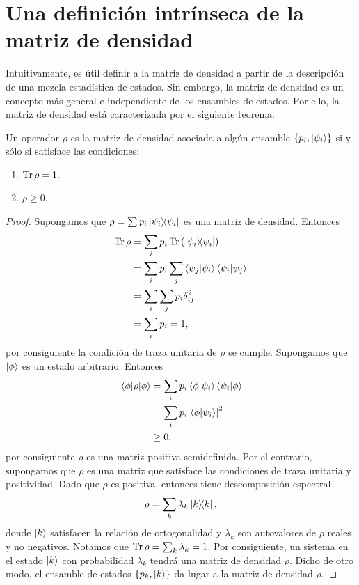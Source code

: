 \documentclass[11pt,dvipsnames]{report}
\newcommand{\psii}{\psi_i}
\begin{document}

\section{Una definición intrínseca de la matriz de densidad}
Intuitivamente, es útil definir a la matriz de densidad a partir de la 
descripción de una mezcla estadística de estados. Sin embargo, la matriz 
de densidad es un concepto más general e independiente de los ensambles de
estados. Por ello, la matriz de densidad está caracterizada por el siguiente
teorema.  
\begin{teorema}
Un operador $\rho$ es la matriz de densidad asociada a algún ensamble 
$\{p_i, \ket{\psi _i} \}$ si y sólo si satisface las condiciones:
\begin{enumerate}
\item $\Tr \rho = 1$.
\item $\rho \geq 0$.
\end{enumerate}	
\end{teorema}

\begin{proof}
	Supongamos que $\rho = \sum p_i\dyad{\psii}{\psii}$ es una matriz de
	densidad. Entonces 
	\begin{align*}
		\Tr \rho &= \sum _i p_i\Tr \qty(\dyad{\psii}{\psii})\\
		&= \sum _i p_i \sum _j \braket{\psi_j}{\psii}\braket{\psii}{\psi_j}\\
		&=\sum _i \sum _j p_i \delta _{ij}^2\\
		&=\sum _i p_i=1,
	\end{align*}
	por consiguiente la condición de traza unitaria de $\rho$ se cumple. 
	Supongamos que $\ket{\phi}$ es un estado arbitrario. Entonces
	\begin{align*}
		\matrixel{\phi}{\rho}{\phi} &= \sum _i p_i \braket{\phi}{\psii}
		\braket{\psii}{\phi} \\
		&=\sum _i p_i \abs{\braket{\phi}{\psii}}^2\\
		&\geq 0,
	\end{align*}
	por consiguiente $\rho$ es una matriz positiva semidefinida. Por el 
	contrario, supongamos que $\rho$ es una matriz que satisface las condiciones
	de traza unitaria y positividad. Dado que $\rho$ es positiva, entonces
	tiene descomposición espectral 
	\begin{align*}
		\rho = \sum _k \lambda _k \dyad{k}{k},
	\end{align*}
	donde $\ket{k}$ satisfacen la relación de ortogonalidad y $\lambda _k$ son
	autovalores de $\rho$ reales y no negativos. Notamos que $\Tr \rho = \sum _k
	\lambda _k = 1$. Por consiguiente, un sistema en el estado $\ket{k}$ con 
	probabilidad $\lambda_k$ tendrá una matriz de densidad $\rho$. Dicho 
	de otro modo, el ensamble de estados $\{ p_k,\ket{k}\}$ da lugar a la matriz
	de densidad $\rho$.
\end{proof}
\end{document}
